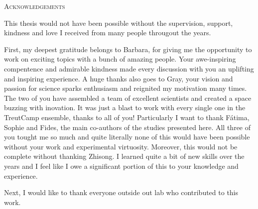 \begin{center}
    \large\textsc{Acknowledgements}
\end{center}

\noindent
This thesis would not have been possible without the supervision, support, kindness and love I received from many people througout the years. 

First, my deepest gratitude belongs to Barbara, for giving me the opportunity to work on exciting topics with a bunch of amazing people. Your awe-inspiring compentence and admirable kindness made every discussion with you an uplifting and inspiring experience. A huge thanks also goes to Gray, your vision and passion for science sparks enthusiasm and reignited my motivation many times. The two of you have assembled a team of excellent scientists and created a space buzzing with inovation. It was just a blast to work with every single one in the TreutCamp ensemble, thanks to all of you! Particularly I want to thank Fátima, Sophie and Fides, the main co-authors of the studies presented here. All three of you tought me so much and quite literally none of this would have been possible without your work and experimental virtuosity. Moreover, this would not be complete without thanking Zhisong. I learned quite a bit of new skills over the years and I feel like I owe a significant portion of this to your knowledge and experience. 




Next, I would like to thank everyone outside out lab who contributed to this work. 


